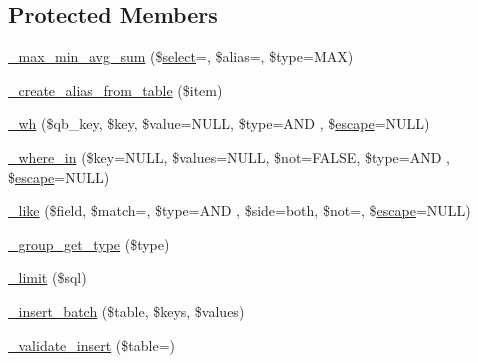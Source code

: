 \subsection*{Protected Members}
\begin{DoxyCompactItemize}
\item 
\mbox{\hyperlink{class_c_i___d_b__query__builder_aea731223718d87a26bb6dc676ee4ee8c}{\+\_\+max\+\_\+min\+\_\+avg\+\_\+sum}} (\$\mbox{\hyperlink{class_c_i___d_b__query__builder_a406a7ea81e717e56496f61baf3e03f44}{select}}=\textquotesingle{}\textquotesingle{}, \$alias=\textquotesingle{}\textquotesingle{}, \$type=\textquotesingle{}M\+AX\textquotesingle{})
\item 
\mbox{\hyperlink{class_c_i___d_b__query__builder_a194edea7be9a8636b67b7d2c8a3de04e}{\+\_\+create\+\_\+alias\+\_\+from\+\_\+table}} (\$item)
\item 
\mbox{\hyperlink{class_c_i___d_b__query__builder_a616af9ae6c40b3fe7074a8517207934f}{\+\_\+wh}} (\$qb\+\_\+key, \$key, \$value=N\+U\+LL, \$type=\textquotesingle{}A\+ND \textquotesingle{}, \$\mbox{\hyperlink{class_c_i___d_b__driver_ac8f37ca5703d4558c732e692194f8cd6}{escape}}=N\+U\+LL)
\item 
\mbox{\hyperlink{class_c_i___d_b__query__builder_a768333bb814b0e99783117da4b51f097}{\+\_\+where\+\_\+in}} (\$key=N\+U\+LL, \$values=N\+U\+LL, \$not=F\+A\+L\+SE, \$type=\textquotesingle{}A\+ND \textquotesingle{}, \$\mbox{\hyperlink{class_c_i___d_b__driver_ac8f37ca5703d4558c732e692194f8cd6}{escape}}=N\+U\+LL)
\item 
\mbox{\hyperlink{class_c_i___d_b__query__builder_abe8f3477d4b15bf422fc52ba753056b5}{\+\_\+like}} (\$field, \$match=\textquotesingle{}\textquotesingle{}, \$type=\textquotesingle{}A\+ND \textquotesingle{}, \$side=\textquotesingle{}both\textquotesingle{}, \$not=\textquotesingle{}\textquotesingle{}, \$\mbox{\hyperlink{class_c_i___d_b__driver_ac8f37ca5703d4558c732e692194f8cd6}{escape}}=N\+U\+LL)
\item 
\mbox{\hyperlink{class_c_i___d_b__query__builder_a0101619da9c48cfa269730ace38a774a}{\+\_\+group\+\_\+get\+\_\+type}} (\$type)
\item 
\mbox{\hyperlink{class_c_i___d_b__query__builder_a3a02ea06541b8ecc25a33a61651562c8}{\+\_\+limit}} (\$sql)
\item 
\mbox{\hyperlink{class_c_i___d_b__query__builder_a1978e1358c812587a46e242630365099}{\+\_\+insert\+\_\+batch}} (\$table, \$keys, \$values)
\item 
\mbox{\hyperlink{class_c_i___d_b__query__builder_acbc0cb4b9bd889fa2ffc5086f65a88a1}{\+\_\+validate\+\_\+insert}} (\$table=\textquotesingle{}\textquotesingle{})

\end{DoxyCompactItemize}
